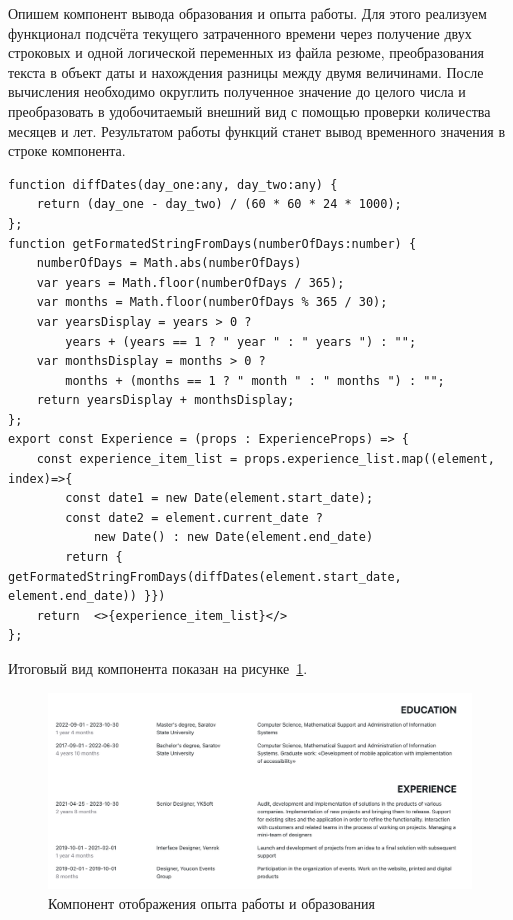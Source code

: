 \documentclass[master, och, pract]{SCWorks}
\begin{document}
Опишем компонент вывода образования и опыта работы. Для этого реализуем функционал подсчёта текущего затраченного времени через получение двух строковых и одной логической переменных из файла резюме, преобразования текста в объект даты и нахождения разницы между двумя величинами. После вычисления необходимо округлить полученное значение до целого числа и преобразовать в удобочитаемый внешний вид с помощью проверки количества месяцев и лет. Результатом работы функций станет вывод временного значения в строке компонента.
\begin{verbatim}
function diffDates(day_one:any, day_two:any) {
    return (day_one - day_two) / (60 * 60 * 24 * 1000);
};
function getFormatedStringFromDays(numberOfDays:number) {
    numberOfDays = Math.abs(numberOfDays)
    var years = Math.floor(numberOfDays / 365);
    var months = Math.floor(numberOfDays % 365 / 30);
    var yearsDisplay = years > 0 ? 
        years + (years == 1 ? " year " : " years ") : "";
    var monthsDisplay = months > 0 ? 
        months + (months == 1 ? " month " : " months ") : "";
    return yearsDisplay + monthsDisplay; 
};
export const Experience = (props : ExperienceProps) => {
    const experience_item_list = props.experience_list.map((element, index)=>{
        const date1 = new Date(element.start_date);
        const date2 = element.current_date ? 
            new Date() : new Date(element.end_date)
        return { getFormatedStringFromDays(diffDates(element.start_date, element.end_date)) }})
    return  <>{experience_item_list}</>
};
\end{verbatim}

Итоговый вид компонента показан на рисунке~\ref{fig:3}.  
\begin{figure}[!ht]
    \centering
    \includegraphics[width=12cm]{images/image-resume-2.png}
    \caption{\label{fig:3}%
        Компонент отображения опыта работы и образования}
\end{figure}
\end{document}
